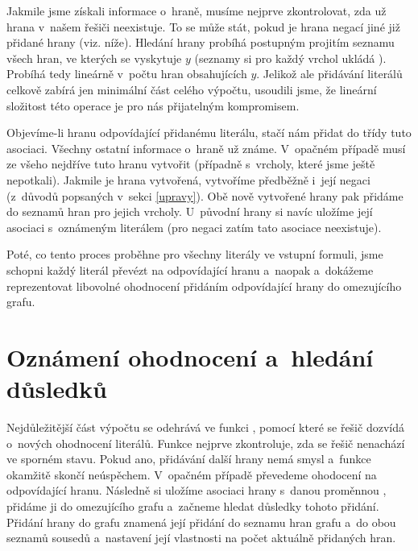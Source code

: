 Jakmile jsme získali informace o~hraně, musíme nejprve zkontrolovat, zda už hrana v~našem řešiči neexistuje. To se může stát, pokud je hrana negací jiné již přidané hrany (viz. níže). %
Hledání hrany probíhá postupným projitím seznamu všech hran, ve kterých se vyskytuje $y$ (seznamy si pro každý vrchol ukládá ). Probíhá tedy lineárně v~počtu hran obsahujících $y$. Jelikož ale přidávání literálů celkově zabírá jen minimální část celého výpočtu, usoudili jsme, že lineární složitost této operace je pro nás přijatelným kompromisem.

Objevíme-li hranu odpovídající přidanému literálu, stačí nám přidat do třídy  tuto asociaci. Všechny ostatní informace o~hraně už známe. V~opačném případě musí ze všeho nejdříve  tuto hranu vytvořit (případně s~vrcholy, které jsme ještě nepotkali). Jakmile je hrana vytvořená, vytvoříme předběžně i~její negaci (z~důvodů popsaných v~sekci \ref{upravy}). Obě nově vytvořené hrany pak přidáme do seznamů hran pro jejich vrcholy. U~původní hrany si navíc uložíme její asociaci s~oznámeným literálem (pro negaci zatím tato asociace neexistuje). 

Poté, co tento proces proběhne pro všechny literály ve vstupní formuli, jsme schopni každý literál převézt na odpovídající hranu a~naopak a~dokážeme reprezentovat libovolné ohodnocení přidáním odpovídající hrany do omezujícího grafu.

\section{Oznámení ohodnocení a~hledání důsledků}\label{dusl}

Nejdůležitější část výpočtu se odehrává ve funkci , pomocí které se řešič dozvídá o~nových ohodnocení literálů. Funkce nejprve zkontroluje, zda se řešič nenachází ve sporném stavu. Pokud ano, přidávání další hrany nemá smysl a~funkce okamžitě skončí neúspěchem. V~opačném případě převedeme ohodocení na odpovídající hranu. Následně si uložíme asociaci hrany s~danou proměnnou , přidáme ji do omezujícího grafu a~začneme hledat důsledky tohoto přidání. Přidání hrany do grafu znamená její přidání do seznamu hran grafu a~do obou seznamů sousedů a~nastavení její vlastnosti  na počet aktuálně přidaných hran.

